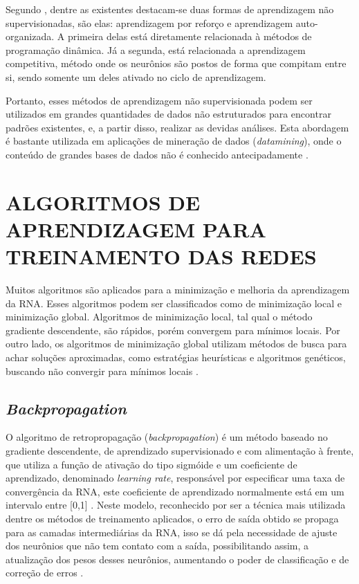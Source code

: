 Segundo , dentre as existentes destacam-se duas formas de aprendizagem não supervisionadas, são elas: aprendizagem por reforço e aprendizagem auto-organizada. A primeira delas está diretamente relacionada à métodos de programação dinâmica. Já a segunda, está relacionada a aprendizagem competitiva, método onde os neurônios são postos de forma que compitam entre si, sendo somente um deles ativado no ciclo de aprendizagem.

Portanto, esses métodos de aprendizagem não supervisionada podem ser utilizados em grandes quantidades de dados não estruturados para encontrar padrões existentes, e, a partir disso, realizar as devidas análises. Esta abordagem é bastante utilizada em aplicações de mineração de dados (\textit{datamining}), onde o conteúdo de grandes bases de dados não é conhecido antecipadamente \cite{elpink}.

\section{ALGORITMOS DE APRENDIZAGEM PARA TREINAMENTO DAS REDES}\label{algoritmos-aprendizagem}
Muitos algoritmos são aplicados para a minimização e melhoria da aprendizagem da RNA. Esses algoritmos podem ser classificados como de minimização local e minimização global. Algoritmos de minimização local, tal qual o método gradiente descendente, são rápidos, porém convergem para mínimos locais. Por outro lado, os algoritmos de minimização global utilizam métodos de busca para achar soluções aproximadas, como estratégias heurísticas e algoritmos genéticos, buscando não convergir para mínimos locais \cite{haykin2000}.

\subsection{\textit{Backpropagation}}
O algoritmo de retropropagação (\textit{backpropagation}) é um método baseado no gradiente descendente, de aprendizado supervisionado e com alimentação à frente, que utiliza a função de ativação do tipo sigmóide e um coeficiente de aprendizado, denominado \textit{learning rate}, responsável por especificar uma taxa de convergência da RNA, este coeficiente de aprendizado normalmente está em um intervalo entre [0,1]    \cite{haykin2000}.
Neste modelo, reconhecido por ser a técnica mais utilizada dentre os métodos de treinamento aplicados, o erro de saída obtido se propaga para as camadas intermediárias da RNA, isso se dá pela necessidade de ajuste dos neurônios que não tem contato com a saída, possibilitando assim, a atualização dos pesos desses neurônios, aumentando o poder de classificação e de correção de erros \cite{medeiros}.

